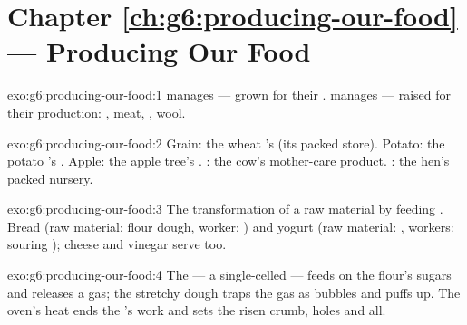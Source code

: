 \section*{Chapter \ref{ch:g6:producing-our-food} --- Producing Our Food}

\begin{solution}{exo:g6:producing-our-food:1}
 manages  ---  grown for their
.  manages  ---
 raised for their production: , meat, , wool.
\end{solution}

\begin{solution}{exo:g6:producing-our-food:2}
Grain: the wheat 's  (its packed store). Potato:
the potato 's . Apple: the apple tree's .
: the cow's mother-care product. : the hen's packed
nursery.
\end{solution}

\begin{solution}{exo:g6:producing-our-food:3}
The transformation of a raw material by feeding .
Bread (raw material: flour dough, worker: ) and yogurt
(raw material: , workers: souring ); cheese and
vinegar serve too.
\end{solution}

\begin{solution}{exo:g6:producing-our-food:4}
The  --- a single-celled  --- feeds on the
flour's sugars and releases a gas; the stretchy dough traps
the gas as bubbles and puffs up. The oven's heat ends the
's work and sets the risen crumb, holes and all.
\end{solution}

